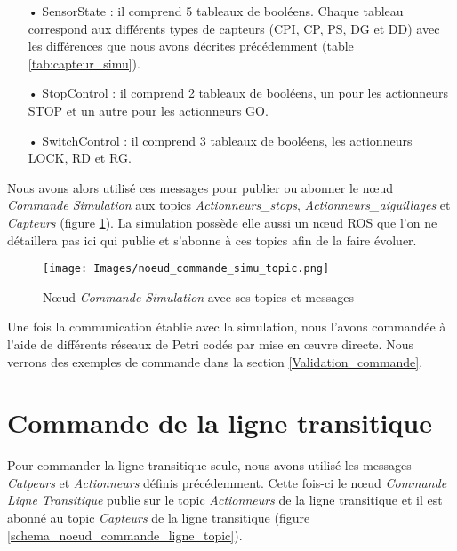 \documentclass[a4paper,french, titlepage]{book}
\begin{document}
\begin{itemize}
\item[ ]
\item[•] SensorState : il comprend 5 tableaux de booléens. Chaque tableau correspond aux différents types de capteurs (CPI, CP, PS, DG et DD) avec les différences que nous avons décrites précédemment (table \ref{tab:capteur_simu}).
\item[•] StopControl : il comprend 2 tableaux de booléens, un pour les actionneurs STOP et un autre pour les actionneurs GO.
\item[•] SwitchControl : il comprend 3 tableaux de booléens, les actionneurs LOCK, RD et RG. 
\item[ ]
\end{itemize}

Nous avons alors utilisé ces messages pour publier ou abonner le nœud \emph{Commande Simulation} aux topics \textit{Actionneurs\_stops}, \emph{Actionneurs\_aiguillages} et \emph{Capteurs} (figure \ref{schema_noeud_commande_simu_topic}). La simulation possède elle aussi un nœud ROS que l'on ne détaillera pas ici qui publie et s'abonne à ces topics afin de la faire évoluer.

\begin{figure}[H] 
\begin{center}
\texttt{[image: Images/noeud\_commande\_simu\_topic.png]} 
\end{center}
\caption{Nœud \emph{Commande Simulation} avec ses topics et messages}
\label{schema_noeud_commande_simu_topic}
\end{figure}

Une fois la communication établie avec la simulation, nous l'avons commandée à l'aide de différents réseaux de Petri codés par mise en œuvre directe. Nous verrons des exemples de commande dans la section \ref{Validation_commande}.

\section{Commande de la ligne transitique}

Pour commander la ligne transitique seule, nous avons utilisé les messages \emph{Catpeurs} et \emph{Actionneurs} définis précédemment. Cette fois-ci le nœud \emph{Commande Ligne Transitique} publie sur le topic \emph{Actionneurs} de la ligne transitique et il est abonné au topic \emph{Capteurs} de la ligne transitique (figure \ref{schema_noeud_commande_ligne_topic}).
\end{document}
